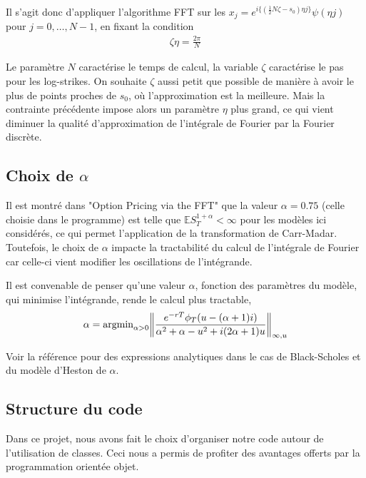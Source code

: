 \documentclass{article}
\begin{document}
Il s'agit donc d'appliquer l'algorithme FFT sur les $x_j= e^{i\{(\frac{1}{2}N\zeta-s_0)\eta j\}}\psi(\eta j)$ pour $j=0,\ldots, N-1$, en fixant la condition \begin{align*}
	\zeta \eta = \frac{2\pi}{N}
\end{align*}

Le paramètre $N$ caractérise le temps de calcul, la variable $\zeta$ caractérise le pas pour les log-strikes. On souhaite $\zeta$ aussi petit que possible de manière à avoir le plus de points proches de $s_0$, où l'approximation est la meilleure. Mais la contrainte précédente impose alors un paramètre $\eta$ plus grand, ce qui vient diminuer la qualité d'approximation de l'intégrale de Fourier par la Fourier discrète.

\subsection{Choix de $\alpha$}
Il est montré dans "Option Pricing via the FFT" que la valeur $\alpha = 0.75$ (celle choisie dans le programme) est telle que $\mathbb{E}S_T^{1+\alpha} <\infty$ pour les modèles ici considérés, ce qui permet l'application de la transformation de Carr-Madar. Toutefois, le choix de $\alpha$ impacte la tractabilité du calcul de l'intégrale de Fourier car celle-ci vient modifier les oscillations de l'intégrande. 

Il est convenable de penser qu'une valeur $\alpha$, fonction des paramètres du modèle, qui minimise l'intégrande, rende le calcul plus tractable, 
\begin{align*}
	\alpha = \textup{argmin}_{\alpha > 0} \bigg\|\frac{e^{-rT}\phi_T(u-(\alpha+1)i)}{\alpha^2+\alpha-u^2+i(2\alpha+1)u}\bigg\|_{\infty, u}
\end{align*}

Voir la référence pour des expressions analytiques dans le cas de Black-Scholes et du modèle d'Heston de $\alpha$.
\subsection{Structure du code}
Dans ce projet, nous avons fait le choix d’organiser notre code autour de l’utilisation de classes. Ceci nous a permis de profiter des avantages offerts par la programmation orientée objet.
\end{document}
